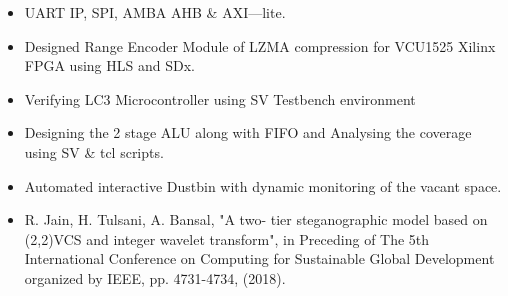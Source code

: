 \begin{itemize}
\item UART IP, SPI, AMBA AHB \& AXI—lite.
\end{itemize}
\smallskip
{}
\begin{itemize}
\item Designed Range Encoder Module of LZMA compression for VCU1525 Xilinx FPGA using HLS and SDx.
\end{itemize}
\smallskip
{}
\begin{itemize}
\item Verifying LC3 Microcontroller using SV Testbench environment \end{itemize}
\smallskip
{}
\begin{itemize}
\item Designing the 2 stage ALU along with FIFO and Analysing the coverage using SV \& tcl scripts.
\end{itemize}
\smallskip
{}
\begin{itemize}
\item Automated interactive Dustbin with dynamic monitoring of the vacant space.
\end{itemize}
\smallskip

\smallskip
\begin{itemize}
\item R. Jain, H. Tulsani, A. Bansal, "A two- tier steganographic model based on (2,2)VCS and integer wavelet transform", in Preceding of The 5th International Conference on Computing for Sustainable Global Development organized by IEEE, pp. 4731-4734, (2018).
\end{itemize}
